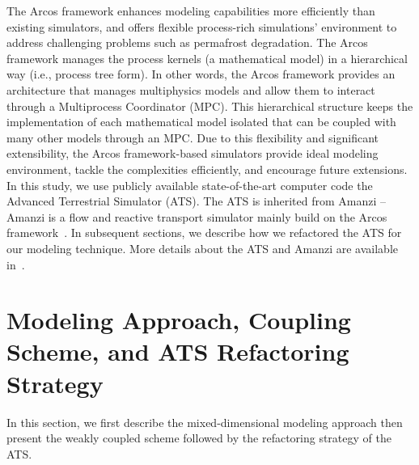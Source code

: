 \documentclass[review]{elsarticle}
\begin{document}
The Arcos framework enhances modeling capabilities more efficiently than existing simulators, and offers flexible process-rich simulations' environment to address challenging problems such as permafrost degradation. The Arcos framework manages the process kernels (a mathematical model) in a hierarchical way (i.e., process tree form). In other words, the Arcos framework provides an architecture that manages multiphysics models and allow them to interact through a Multiprocess Coordinator (MPC). This hierarchical structure keeps the implementation of each mathematical model isolated that can be coupled with many other models through an MPC. Due to this flexibility and significant extensibility, the Arcos framework-based simulators provide ideal modeling environment, tackle the complexities efficiently, and encourage future extensions. 
In this study, we use publicly available state-of-the-art computer code the Advanced Terrestrial Simulator (ATS). The ATS is inherited from Amanzi -- Amanzi is a flow and reactive transport simulator mainly build on the Arcos framework~\cite{moulton2012high}. In subsequent sections, we describe how we refactored the ATS for our modeling technique. More details about the ATS and Amanzi are available in~\cite{ecoon2016managing, moulton2012high, spainter2016integrated}.


\section{Modeling Approach, Coupling Scheme, and ATS Refactoring Strategy}\label{mixed-dim-model}

In this section, we first describe the mixed-dimensional modeling approach then present the weakly coupled scheme followed by the refactoring strategy of the ATS.
\end{document}
